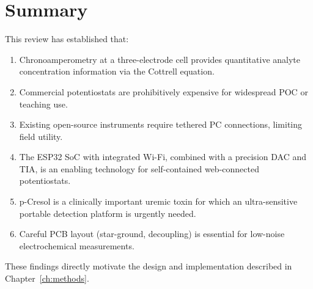 \section{Summary}
\label{sec:litreview_summary}

This review has established that:
\begin{enumerate}
    \item Chronoamperometry at a three-electrode cell provides quantitative analyte concentration information via the Cottrell equation.
    \item Commercial potentiostats are prohibitively expensive for widespread POC or teaching use.
    \item Existing open-source instruments require tethered PC connections, limiting field utility.
    \item The ESP32 SoC with integrated Wi-Fi, combined with a precision DAC and TIA, is an enabling technology for self-contained web-connected potentiostats.
    \item p-Cresol is a clinically important uremic toxin for which an ultra-sensitive portable detection platform is urgently needed.
    \item Careful PCB layout (star-ground, decoupling) is essential for low-noise electrochemical measurements.
\end{enumerate}

These findings directly motivate the design and implementation described in Chapter~\ref{ch:methods}.

